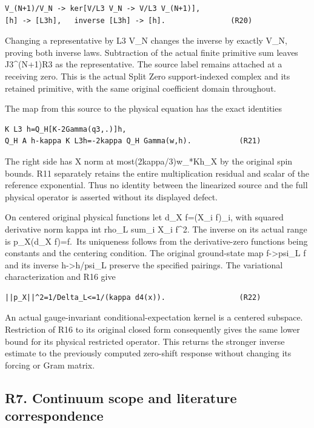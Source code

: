\documentclass[11pt,a4paper]{article}
\renewcommand{\[}{\begingroup\small\originaldisplaystart}
\renewcommand{\]}{\originaldisplayend\endgroup}
\begin{document}
\begin{verbatim}
V_(N+1)/V_N -> ker[V/L3 V_N -> V/L3 V_(N+1)],
[h] -> [L3h],   inverse [L3h] -> [h].               (R20)
\end{verbatim}

Changing a representative by L3 V\_N changes the inverse by exactly
V\_N, proving both inverse laws. Subtraction of the actual finite
primitive sum leaves J3\^{}(N+1)R3 as the representative. The source
label remains attached at a receiving zero. This is the actual Split
Zero support-indexed complex and its retained primitive, with the same
original coefficient domain throughout.

The map from this source to the physical equation has the exact
identities

\begin{verbatim}
K L3 h=Q_H[K-2Gamma(q3,.)]h,
Q_H A h-kappa K L3h=-2kappa Q_H Gamma(w,h).           (R21)
\end{verbatim}

The right side has X norm at
most(2kappa/3)w\_*\textbar\textbar Kh\textbar\textbar\_X by the original
spin bounds. R11 separately retains the entire multiplication residual
and scalar of the reference exponential. Thus no identity between the
linearized source and the full physical operator is asserted without its
displayed defect.

On centered original physical functions let d\_X f=(X\_i f)\_i, with
squared derivative norm kappa int rho\_L sum\_i \textbar X\_i
f\textbar\^{}2. The inverse on its actual range is p\_X(d\_X f)=f.~Its
uniqueness follows from the derivative-zero functions being constants
and the centering condition. The original ground-state map
f-\textgreater psi\_L f and its inverse h-\textgreater h/psi\_L preserve
the specified pairings. The variational characterization and R16 give

\begin{verbatim}
||p_X||^2=1/Delta_L<=1/(kappa d4(x)).                 (R22)
\end{verbatim}

An actual gauge-invariant conditional-expectation kernel is a centered
subspace. Restriction of R16 to its original closed form consequently
gives the same lower bound for its physical restricted operator. This
returns the stronger inverse estimate to the previously computed
zero-shift response without changing its forcing or Gram matrix.

\subsection{R7. Continuum scope and literature
correspondence}\label{r7.-continuum-scope-and-literature-correspondence}
\end{document}
